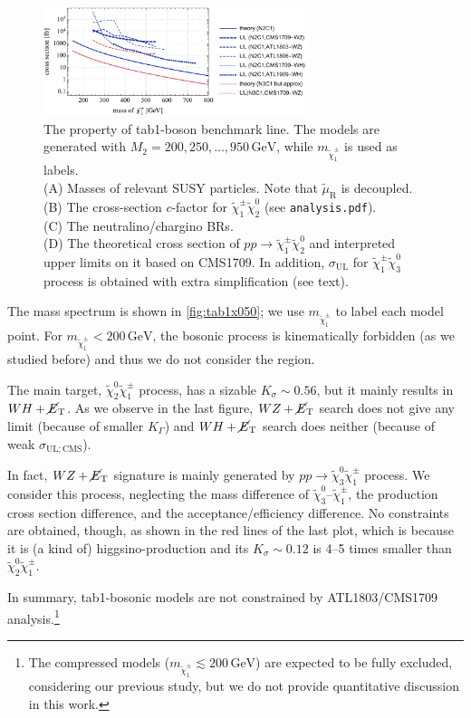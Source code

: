 \documentclass[a4paper,10pt,captions=tableheading,DIV=14]{scrartcl}
\numberwithin{equation}{section}
\newcommand\w[1]{_{\mathrm{#1}}}
\newcommand\unit[1]{\,\mathrm{#1}\xspace}
\newcommand\GeV{\unit{GeV}}
\newcommand\neut  [1][\relax]{{\tilde\chi^0_{#1}}}
\newcommand\charPM[1][\relax]{{\tilde\chi^\pm_{#1}}}
\newcommand\mET{\cancel{E}\w T}
\begin{document}
\begin{figure}[h]
  \includegraphics[height=90pt]{../plots/plot_tab1boson_limit.pdf}
  \caption{\label{fig:tab1x095}The property of tab1-boson benchmark line. The models are generated with $M_2=200,250,\dots,950\GeV$, while $m_{\charPM[1]}$ is used as labels.\\
 (A) Masses of relevant SUSY particles. Note that $\tilde\mu\w R$ is decoupled.\\
 (B) The cross-section $c$-factor for $\charPM[1]\neut[2]$ (see \texttt{analysis.pdf}).\\
 (C) The neutralino/chargino BRs.\\
 (D) The theoretical cross section of $pp\to\charPM[1]\neut[2]$ and interpreted upper limits on it based on CMS1709. In addition, $\sigma\w{UL}$ for $\charPM[1]\neut[3]$ process is obtained with extra simplification (see text).
}
\end{figure}


The mass spectrum is shown in \cref{fig:tab1x050}; we use $m_{\charPM[1]}$ to label each model point.
For $m_{\charPM[1]}<200\GeV$, the bosonic process is kinematically forbidden (as we studied before) and thus we do not consider the region.

The main target, $\neut[2]\charPM[1]$ process, has a sizable $K_\sigma\sim0.56$, but it mainly results in $WH+\mET$.
As we observe in the last figure, $WZ+\mET$ search does not give any limit (because of smaller $K_\Gamma$) and $WH+\mET$ search does neither (because of weak $\sigma\w{UL;CMS}$).

In fact, $WZ+\mET$ signature is mainly generated by $pp\to\neut[3]\charPM[1]$ process.
We consider this process, neglecting the mass difference of $\neut[3]$--$\charPM[1]$, the production cross section difference, and the acceptance/efficiency difference.
No constraints are obtained, though, as shown in the red lines of the last plot, which is because it is (a kind of) higgsino-production and its $K_\sigma\sim0.12$ is 4--5 times smaller than $\neut[2]\charPM[1]$.

In summary, tab1-bosonic models are not constrained by ATL1803/CMS1709 analysis.\footnote{The compressed models ($m_{\charPM[1]}\lesssim200\GeV$) are expected to be fully excluded, considering our previous study, but we do not provide quantitative discussion in this work.}
\end{document}
